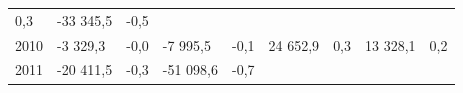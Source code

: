 \begin{longtable}[]{@{}lllllllll@{}}
\begin{minipage}[t]{0.06\columnwidth}
0,3\strut
\end{minipage} & \begin{minipage}[t]{0.09\columnwidth}\raggedright
-33 345,5\strut
\end{minipage} & \begin{minipage}[t]{0.06\columnwidth}\raggedright
-0,5\strut
\end{minipage}\tabularnewline
\begin{minipage}[t]{0.05\columnwidth}\raggedright
2010\strut
\end{minipage} & \begin{minipage}[t]{0.10\columnwidth}\raggedright
-3 329,3\strut
\end{minipage} & \begin{minipage}[t]{0.06\columnwidth}\raggedright
-0,0\strut
\end{minipage} & \begin{minipage}[t]{0.16\columnwidth}\raggedright
-7 995,5\strut
\end{minipage} & \begin{minipage}[t]{0.06\columnwidth}\raggedright
-0,1\strut
\end{minipage} & \begin{minipage}[t]{0.12\columnwidth}\raggedright
24 652,9\strut
\end{minipage} & \begin{minipage}[t]{0.06\columnwidth}\raggedright
0,3\strut
\end{minipage} & \begin{minipage}[t]{0.09\columnwidth}\raggedright
13 328,1\strut
\end{minipage} & \begin{minipage}[t]{0.06\columnwidth}\raggedright
0,2\strut
\end{minipage}\tabularnewline
\begin{minipage}[t]{0.05\columnwidth}\raggedright
2011\strut
\end{minipage} & \begin{minipage}[t]{0.10\columnwidth}\raggedright
-20 411,5\strut
\end{minipage} & \begin{minipage}[t]{0.06\columnwidth}\raggedright
-0,3\strut
\end{minipage} & \begin{minipage}[t]{0.16\columnwidth}\raggedright
-51 098,6\strut
\end{minipage} & \begin{minipage}[t]{0.06\columnwidth}\raggedright
-0,7\strut
\end{minipage} & \begin{minipage}[t]{0.12\columnwidth}\raggedright

\end{minipage}
\end{longtable}
